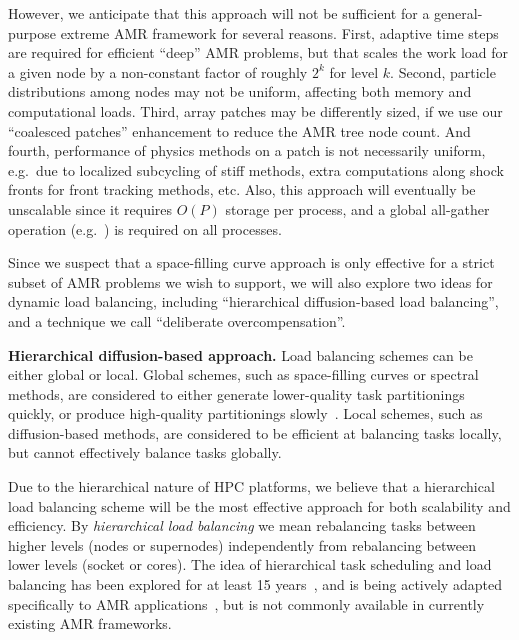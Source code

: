 \documentclass[10pt,twocolumn]{article}
\begin{document}
However, we anticipate that this approach will not be sufficient for a
general-purpose extreme AMR framework for several reasons.
%
First, adaptive time steps are required for efficient ``deep'' AMR
problems, but that scales the work load for a given node by a
non-constant factor of roughly $2^k$ for level $k$.
%
Second, particle distributions among nodes may not be uniform, affecting both memory and computational loads.
%
Third, array patches may be differently sized, if we use our
``coalesced patches'' enhancement to reduce the AMR tree node count.
%
And fourth, performance of physics methods on a patch is not
necessarily uniform, e.g.~due to localized subcycling of stiff
methods, extra computations along shock fronts for front tracking
methods, etc.  
%
Also, this approach will eventually be unscalable since it
requires $O(P)$ storage per process, and a global all-gather
operation (e.g.~) is required on all processes.

Since we suspect that a space-filling curve approach is only effective
for a strict subset of AMR problems we wish to support, we will also
explore two ideas for dynamic load balancing, including ``hierarchical
diffusion-based load balancing'', and a technique we call
``deliberate overcompensation''.

\textbf{Hierarchical diffusion-based approach.} Load balancing
schemes can be either global or local.  Global schemes, such as
space-filling curves or spectral methods, are considered to either
generate lower-quality task partitionings quickly, or produce
high-quality partitionings slowly~\cite{ScKa97}.  Local schemes,
such as diffusion-based methods, are considered to be efficient
at balancing tasks locally, but cannot effectively balance tasks
globally.

Due to the hierarchical nature of HPC platforms, we believe that a
hierarchical load balancing scheme will be the most effective approach
for both scalability and efficiency.  By \textit{hierarchical load
  balancing} we mean rebalancing tasks between higher levels (nodes or
supernodes) independently from rebalancing between lower levels
(socket or cores).  The idea of hierarchical task scheduling and load
balancing has been explored for at least 15 years~\cite{AhGh94}, and
is being actively adapted specifically to AMR
applications~\cite{LaTa06}, but is not commonly available in currently
existing AMR frameworks.
\end{document}
